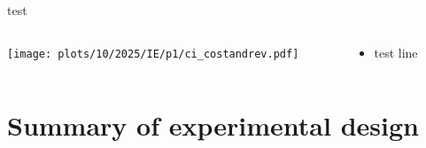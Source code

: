 \begin{frame}{test}
  
  \begin{columns}[T]
  \begin{column}{9cm}
  \centering
  
  \texttt{[image: plots/10/2025/IE/p1/ci\_costandrev.pdf]}
  \end{column}
  \begin{column}{5cm}
  
    \vspace{.5cm}
  
    \begin{itemize}
    \item test line
    \end{itemize}
  \end{column}
  \end{columns}
  
  \end{frame}



\section{Summary of experimental design}

